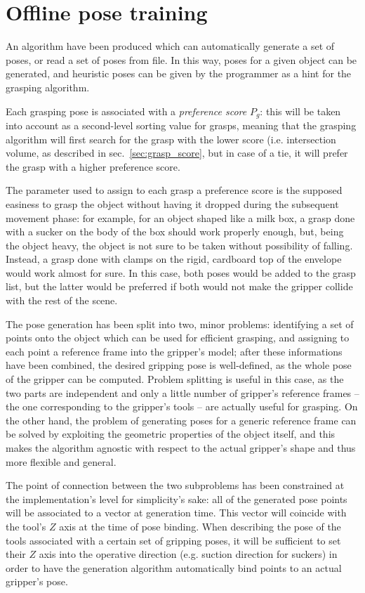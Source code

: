\section{Offline pose training} \label{sec:pose-generation}
An algorithm have been produced which can automatically generate a set of
poses, or read a set of poses from file. In this way, poses for a given object
can be generated, and heuristic poses can be given by the programmer as a hint
for the grasping algorithm.  

Each grasping pose is associated with a \emph{preference score} $P_{g}$: this will be taken
into account as a second-level sorting value for grasps, meaning that the
grasping algorithm will first search for the grasp with the lower score (i.e.
intersection volume, as described in sec.~\ref{sec:grasp_score}, but in case of
a tie, it will prefer the grasp with a higher preference score.

The parameter used to assign to each grasp a preference score is the supposed
easiness to grasp the object without having it dropped during the subsequent
movement phase: for example, for an object shaped like a milk box, a
grasp done with a sucker on the body of the box
should work properly enough, but, being the object heavy, the
object is not sure to be taken without possibility of falling. Instead, a grasp
done with clamps on the rigid, cardboard top of the envelope would work almost
for sure. In this case, both poses would be added to the grasp list, but the
latter would be preferred if both would not make the gripper collide with the
rest of the scene.

The pose generation has been split into two, minor problems: identifying a
set of points onto the object which can be used for efficient grasping, and
assigning to each point a reference frame into the gripper's model; after these
informations have been combined, the desired gripping pose is well-defined, as the
whole pose of the gripper can be computed. Problem splitting is useful in this
case, as the two parts are independent and only a little number of gripper's
reference frames -- the one corresponding to the gripper's tools -- are actually
useful for grasping. On the other hand, the problem of  generating poses for a generic
reference frame can be solved by exploiting the geometric properties of the
object itself, and this makes the algorithm agnostic with respect to the actual
gripper's shape and thus more flexible and general.

The point of connection between the two subproblems has been constrained at the
implementation's level for simplicity's sake: all of the generated pose
points will be associated to a vector at generation time. This vector will
coincide with the tool's $Z$ axis at the time of pose binding. When describing
the pose of the tools associated with a certain set of gripping poses, it will
be sufficient to set their $Z$ axis into the operative direction (e.g. suction
direction for suckers) in order to have the generation algorithm automatically
bind points to an actual gripper's pose.

